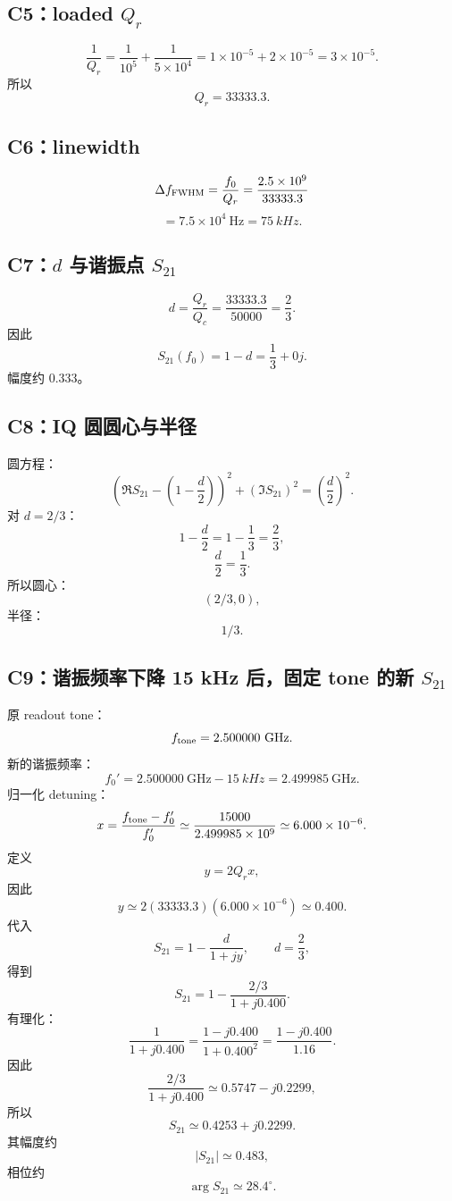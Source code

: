 \documentclass[11pt,a4paper,openany]{ctexrep}
\begin{document}
\subsection*{C5：loaded $Q_r$}

\[
\frac1{Q_r}=\frac1{10^5}+\frac1{5\times10^4}
=1\times10^{-5}+2\times10^{-5}
=3\times10^{-5}.
\]
所以
\[
\boxed{Q_r=33333.3}.
\]

\subsection*{C6：linewidth}

\[
\Delta f_{\rm FWHM}=\frac{f_0}{Q_r}
=\frac{2.5\times10^9}{33333.3}
\]
\[
=7.5\times10^4\ \mathrm{Hz}
=\boxed{\SI{75}{kHz}}.
\]

\subsection*{C7：$d$ 与谐振点 $S_{21}$}

\[
d=\frac{Q_r}{Q_c}
=\frac{33333.3}{50000}
=\boxed{\frac23}.
\]
因此
\[
S_{21}(f_0)=1-d
=\boxed{\frac13+0j}.
\]
幅度约 $0.333$。

\subsection*{C8：IQ 圆圆心与半径}

圆方程：
\[
\left(\Re S_{21}-\left(1-\frac d2\right)\right)^2
+(\Im S_{21})^2
=\left(\frac d2\right)^2.
\]
对 $d=2/3$：
\[
1-\frac d2=1-\frac13=\frac23,
\]
\[
\frac d2=\frac13.
\]
所以圆心：
\[
\boxed{(2/3,0)},
\]
半径：
\[
\boxed{1/3}.
\]

\subsection*{C9：谐振频率下降 15 kHz 后，固定 tone 的新 $S_{21}$}

原 readout tone：
\[
f_{\rm tone}=2.500000\ \mathrm{GHz}.
\]
新的谐振频率：
\[
f_0'=2.500000\ \mathrm{GHz}-\SI{15}{kHz}
=2.499985\ \mathrm{GHz}.
\]
归一化 detuning：
\[
x=\frac{f_{\rm tone}-f_0'}{f_0'}
\simeq\frac{15000}{2.499985\times10^9}
\simeq6.000\times10^{-6}.
\]
定义
\[
y=2Q_r x,
\]
因此
\[
y\simeq2(33333.3)(6.000\times10^{-6})
\simeq0.400.
\]
代入
\[
S_{21}=1-\frac{d}{1+jy},
\qquad d=\frac23,
\]
得到
\[
S_{21}
=1-\frac{2/3}{1+j0.400}.
\]
有理化：
\[
\frac{1}{1+j0.400}
=\frac{1-j0.400}{1+0.400^2}
=\frac{1-j0.400}{1.16}.
\]
因此
\[
\frac{2/3}{1+j0.400}
\simeq0.5747-j0.2299,
\]
所以
\[
\boxed{
S_{21}\simeq0.4253+j0.2299
}.
\]
其幅度约
\[
|S_{21}|\simeq0.483,
\]
相位约
\[
\arg S_{21}\simeq28.4^\circ.
\]
\end{document}
